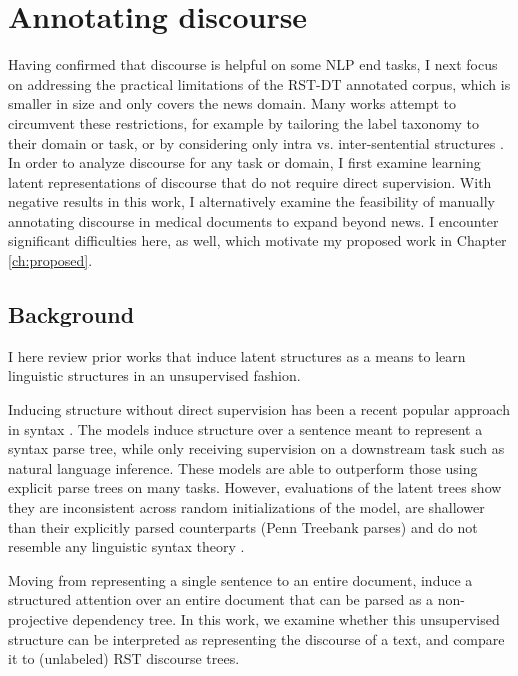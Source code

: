 \section{Annotating discourse} 
Having confirmed that discourse is helpful on some NLP end tasks, I next focus on addressing the practical limitations of the RST-DT annotated corpus, which is smaller in size and only covers the news domain. Many works attempt to circumvent these restrictions, for example by tailoring the label taxonomy to their domain or task, or by considering only intra vs. inter-sentential structures \cite{daCunha:2007,Bhatia:2015,Hogenboom:2015}. In order to analyze discourse for any task or domain, I first  examine learning latent representations of discourse that do not require direct supervision. With negative results in this work, I alternatively examine the feasibility of manually annotating discourse in medical documents to expand beyond news. I encounter significant difficulties here, as well, which motivate my proposed work in Chapter \ref{ch:proposed}.

\subsection{Background}
I here review prior works that induce latent structures as a means to learn linguistic structures in an unsupervised fashion.

 Inducing structure without direct supervision has been a recent popular approach in syntax \cite{Yogatama:2017,Choi:2018,Bisk:2018}. The models induce structure over a sentence meant to represent a syntax parse tree, while only receiving supervision on a downstream task such as natural language inference. These models are able to outperform those using explicit parse trees on many tasks. However, evaluations of the latent trees show they are inconsistent across random initializations of the model, are shallower than their explicitly parsed counterparts (Penn Treebank parses) and do not resemble any linguistic syntax theory \cite{Williams:2018}.

Moving from representing a single sentence to an entire document,  induce a structured attention over an entire document that can be parsed as a non-projective dependency tree. In this work, we examine whether this unsupervised structure can be interpreted as representing the discourse of a text, and compare it to (unlabeled) RST discourse trees.


